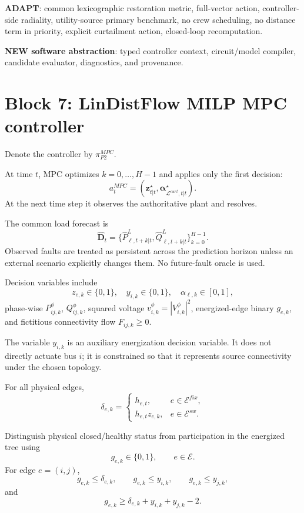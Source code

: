 \documentclass[11pt]{article}
\begin{document}
\textbf{ADAPT}: common lexicographic restoration metric, full-vector action,
controller-side radiality, utility-source primary benchmark, no crew scheduling,
no distance term in priority, explicit curtailment action, closed-loop recomputation.

\textbf{NEW software abstraction}: typed controller context, circuit/model compiler,
candidate evaluator, diagnostics, and provenance.

\section{Block 7: LinDistFlow MILP MPC controller}
Denote the controller by $\pi_{P2}^{MPC}$.

At time $t$, MPC optimizes $k=0,\dots,H-1$ and applies only the first decision:
\[
\boxed{
a_t^{MPC}
=
\left(
\mathbf z_{t|t}^{\star},
\boldsymbol\alpha_{\mathcal L^{curt},t|t}^{\star}
\right).}
\]
At the next time step it observes the authoritative plant and resolves.

The common load forecast is
\[
\hat{\mathbf D}_t
=
\{\hat P_{\ell,t+k|t}^{L},\hat Q_{\ell,t+k|t}^{L}\}_{k=0}^{H-1}.
\]
Observed faults are treated as persistent across the prediction horizon unless an
external scenario explicitly changes them. No future-fault oracle is used.

Decision variables include
\[
z_{e,k}\in\{0,1\},\quad
y_{i,k}\in\{0,1\},\quad
\alpha_{\ell,k}\in[0,1],
\]
phase-wise $P_{ij,k}^{\phi}$, $Q_{ij,k}^{\phi}$, squared voltage
$v_{i,k}^{\phi}=|V_{i,k}^{\phi}|^2$, energized-edge binary $g_{e,k}$, and
fictitious connectivity flow $F_{ij,k}\ge0$.

The variable $y_{i,k}$ is an auxiliary energization decision variable. It does not
directly actuate bus $i$; it is constrained so that it represents source connectivity
under the chosen topology.

For all physical edges,
\[
\boxed{
\delta_{e,k}=
\begin{cases}
h_{e,t}, & e\in\mathcal E^{fix},\\
h_{e,t}z_{e,k}, & e\in\mathcal E^{sw}.
\end{cases}}
\]

Distinguish physical closed/healthy status from participation in the energized tree
using
\[
g_{e,k}\in\{0,1\},\qquad e\in\mathcal E.
\]
For edge $e=(i,j)$,
\[
g_{e,k}\le \delta_{e,k},\qquad
g_{e,k}\le y_{i,k},\qquad
g_{e,k}\le y_{j,k},
\]
and
\[
g_{e,k}\ge \delta_{e,k}+y_{i,k}+y_{j,k}-2.
\]
\end{document}
